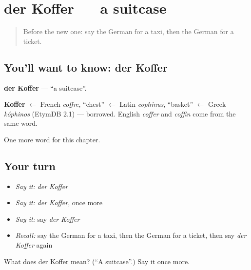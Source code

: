 \section[der Koffer]{der Koffer — a suitcase}

\label{lesson:GE-C111-koffer}



\begin{quote}
Before the new one: say the German for a taxi, then the German for a ticket.
\end{quote}

\subsection*{You'll want to know: der Koffer}
\textbf{der Koffer} — \textquotedblleft{}a suitcase\textquotedblright{}.

\begin{cousinweb}
\textbf{Koffer} $\leftarrow$ French \emph{coffre}, \textquotedblleft{}chest\textquotedblright{} $\leftarrow$ Latin \emph{cophinus}, \textquotedblleft{}basket\textquotedblright{} $\leftarrow$ Greek \emph{kóphinos} (EtymDB 2.1) — borrowed. English \emph{coffer} and \emph{coffin} come from the same word.
\end{cousinweb}

\begin{grammarlens}[title={What you've built}]
One more word for this chapter.
\end{grammarlens}

\subsection*{Your turn}
\begin{itemize}
\raggedright
  \item \emph{Say it:} \emph{der Koffer}
  \item \emph{Say it:} \emph{der Koffer}, once more
  \item \emph{Say it:} say \emph{der Koffer}
  \item \emph{Recall:} say the German for a taxi, then the German for a ticket, then say \emph{der Koffer} again
\end{itemize}

\begin{tcolorbox}[breakable,colback=teal!4,colframe=teal!35!black,title={Before you move on}]
What does der Koffer mean? (\textquotedblleft{}A suitcase\textquotedblright{}.) Say it once more.
\end{tcolorbox}
